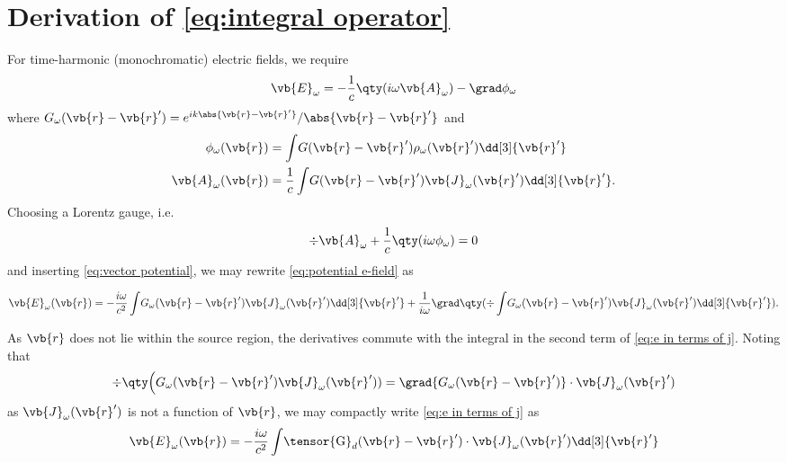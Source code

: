\section{Derivation of \cref{eq:integral operator}}

For time-harmonic (monochromatic) electric fields, we require
\begin{equation}
  \vb{E}_\omega = - \frac{1}{c} \qty(i \omega \vb{A}_\omega) - \grad \phi_\omega
  \label{eq:potential e-field}
\end{equation}
where $G_\omega(\vb{r} - \vb{r}') = e^{i k \abs{\vb{r} - \vb{r}'}}/\abs{\vb{r} - \vb{r}'}$ and
\begin{subequations}
  \begin{align}
      \phi_\omega(\vb{r}) &= \int \! G(\vb{r} - \vb{r}') \rho_\omega(\vb{r}') \dd[3]{\vb{r}'} \label{eq:scalar potential} \\
    \vb{A}_\omega(\vb{r}) &= \frac{1}{c} \int \! G(\vb{r} - \vb{r}') \vb{J}_\omega(\vb{r}') \dd[3]{\vb{r}'}. \label{eq:vector potential}
  \end{align}
\end{subequations}
Choosing a Lorentz gauge, i.e.\
\begin{equation}
  \div{\vb{A}_\omega} + \frac{1}{c} \qty(i \omega \phi_\omega) = 0
\end{equation}
and inserting \cref{eq:vector potential}, we may rewrite \cref{eq:potential e-field} as
\begin{widetext}
\begin{equation}
  \vb{E}_\omega(\vb{r}) = -\frac{i \omega}{c^2} \int \! G_\omega(\vb{r} - \vb{r}') \vb{J}_\omega(\vb{r}') \dd[3]{\vb{r}'} + \frac{1}{i \omega} \grad \qty( \div \int \! G_\omega(\vb{r} - \vb{r}') \vb{J}_\omega(\vb{r}') \dd[3]{\vb{r}'} ).
  \label{eq:e in terms of j}
\end{equation}
\end{widetext}
As $\vb{r}$ does not lie within the source region, the derivatives commute with the integral in the second term of \cref{eq:e in terms of j}.
Noting that
\begin{equation}
  \div \qty\Big(G_\omega(\vb{r} - \vb{r}') \vb{J}_\omega(\vb{r}')) =\grad{G_\omega(\vb{r} - \vb{r}')} \cdot \vb{J}_\omega(\vb{r}')
\end{equation}
as $\vb{J}_\omega(\vb{r}')$ is not a function of $\vb{r}$, we may compactly write \cref{eq:e in terms of j} as
\begin{equation}
  \vb{E}_\omega(\vb{r}) = -\frac{i \omega}{c^2} \int \! \tensor{\mathrm{G}}_d(\vb{r} - \vb{r}') \cdot \vb{J}_\omega(\vb{r}') \dd[3]{\vb{r}'}
  \label{eq:frequency domain dyadic green function}
\end{equation}

